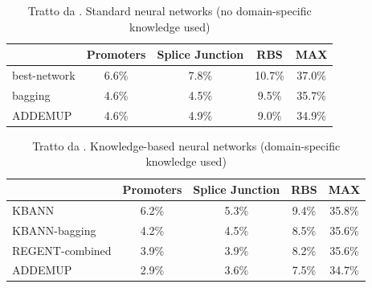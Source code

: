 \documentclass[a4paper,12pt]{report}
\begin{document}
  \begin{table}[h]\caption{Tratto da \cite{opitz1994using}. Standard neural networks (no domain-specific knowledge used)} \label{NoKnowledgeTab}
   \centering
   \begin{tabular}[h]{|l|c|c|c|c|}
    \hline
    & Promoters & Splice Junction & RBS & MAX \\ \hline
   best-network & 6.6\% & 7.8\% & 10.7\% & 37.0\% \\ 
   bagging & 4.6\% & 4.5\% & 9.5\% & 35.7\% \\
   ADDEMUP & 4.6\% & 4.9\% & 9.0\% & 34.9\% \\ \hline
   \end{tabular}
  \end{table}
  
  \begin{table}[h]\caption{Tratto da \cite{opitz1994using}. Knowledge-based neural networks (domain-specific knowledge used)} \label{KnowledgeTab}
   \centering
   \begin{tabular}[h]{|l|c|c|c|c|}
    \hline
       & Promoters & Splice Junction & RBS & MAX \\ \hline
    KBANN & 6.2\% & 5.3\% & 9.4\% & 35.8\% \\ 
    KBANN-bagging & 4.2\% & 4.5\% & 8.5\% & 35.6\% \\
    REGENT-combined & 3.9\% & 3.9\% & 8.2\% & 35.6\% \\
    ADDEMUP & 2.9\% & 3.6\% & 7.5\% & 34.7\% \\ \hline
   \end{tabular}
  \end{table}
\end{document}
